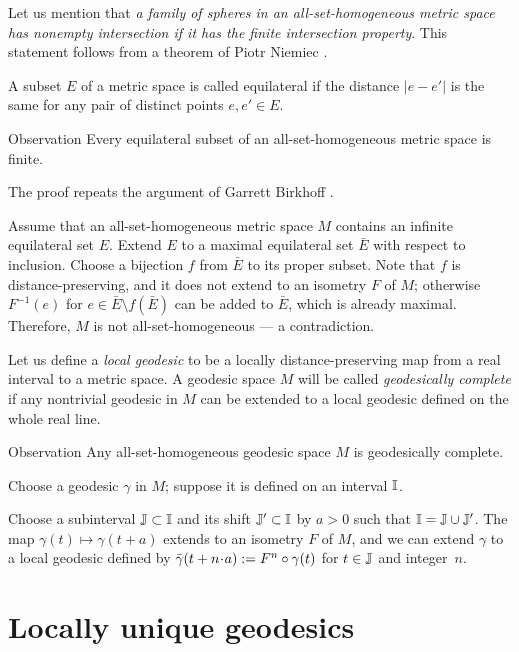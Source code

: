 \documentclass[leqno,a4paper,10pt]{article}
\begin{document}
Let us mention that \emph{a family of spheres in an all-set-homogeneous metric space has nonempty intersection if it has the finite intersection property}.
This statement follows from a theorem of Piotr Niemiec \cite[3.9]{niemiec2023}.

A subset $E$ of a metric space is called equilateral if the distance $|e-e'|$ is the same for any pair of distinct points $e,e'\in E$.

\begin{thm}{Observation}\label{obs:equilateral}
Every equilateral subset of an all-set-homogeneous metric space is finite.
\end{thm}

The proof repeats the argument of Garrett Birkhoff \cite[Theorem 18]{birkhoff}.

Assume that an all-set-homogeneous metric space $M$ contains an infinite equilateral set $E$.
Extend $E$ to a maximal equilateral set $\bar E$ with respect to inclusion.
Choose a bijection $f$ from $\bar E$ to its proper subset.
Note that $f$ is distance-preserving, and it does not extend to an isometry $F$ of $M$;
otherwise $F^{-1}(e)$ for $e\in \bar E\setminus f(\bar E)$ can be added to $\bar E$, which is already maximal.
Therefore, $M$ is not all-set-homogeneous --- a contradiction.
\qeds

Let us define a \emph{local geodesic} to be a locally distance-preserving map from a real interval to a metric space.
A geodesic space $M$ will be called \emph{geodesically complete}
if any nontrivial geodesic in $M$ can be extended to a local geodesic defined on the whole real line.

\begin{thm}{Observation}\label{obs:geodesically-complete}
Any all-set-homogeneous geodesic space $M$ is geodesically complete.
\end{thm}

Choose a geodesic $\gamma$ in $M$;
suppose it is defined on an interval $\mathbb{I}$.

Choose a subinterval $\mathbb{J}\subset \mathbb{I}$ and its shift $\mathbb{J}'\subset \mathbb{I}$ by $a>0$ such that $\mathbb{I}=\mathbb{J}\cup\mathbb{J}'$.
The map $\gamma(t)\mapsto \gamma(t+a)$ extends to an isometry $F $ of $M$,
and we can extend $\gamma$ to a local geodesic defined by $\bar\gamma(t+n\cdot a)\df F^n\circ \gamma(t)$
for $t\in \mathbb{J}$ and integer~$n$.
\qeds

\section{Locally unique geodesics}
\end{document}
